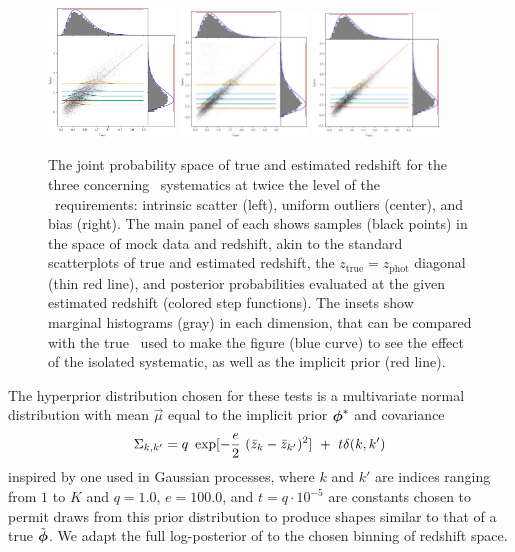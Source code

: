 \begin{figure}
	\begin{center}
		\includegraphics[width=0.3\textwidth]{figures/chippr/scatter_scatplot.png}
		\includegraphics[width=0.3\textwidth]{figures/chippr/outlier_scatplot.png}
		\includegraphics[width=0.3\textwidth]{figures/chippr/bias_scatplot.png}
		\caption{The joint probability space of true and estimated redshift for the three concerning \pz\ systematics at twice the level of the \lsst\ requirements: intrinsic scatter (left), uniform outliers (center), and bias (right).
			The main panel of each shows samples (black points) in the space of mock data and redshift, akin to the standard scatterplots of true and estimated redshift, the $z_{\mathrm{true}} = z_{\mathrm{phot}}$ diagonal (thin red line), and posterior probabilities evaluated at the given estimated redshift (colored step functions).
			The insets show marginal histograms (gray) in each dimension, that can be compared with the true \nz\ used to make the figure (blue curve) to see the effect of the isolated systematic, as well as the implicit prior (red line).
		}
	\end{center}
\end{figure}

The hyperprior distribution chosen for these tests is a multivariate normal distribution with mean $\vec{\mu}$ equal to the implicit prior ${\boldsymbol{\phi}}^{*}$ and covariance
\begin{equation}
\eqlabel{eqn:priorcov}
\Sigma_{k,k'} = q\ \exp[-\frac{e}{2}\ (\bar{z}_{k}-\bar{z}_{k'})^{2}]\ +\ t\delta(k,k')
\end{equation}
inspired by one used in Gaussian processes, where $k$ and $k'$ are indices ranging from $1$ to $K$ and $q=1.0$, $e=100.0$, and $t=q\cdot10^{-5}$ are constants chosen to permit draws from this prior distribution to produce shapes similar to that of a true $\tilde{{\boldsymbol{\phi}}}$.  
We adapt the full log-posterior of  to the chosen binning of redshift space.

